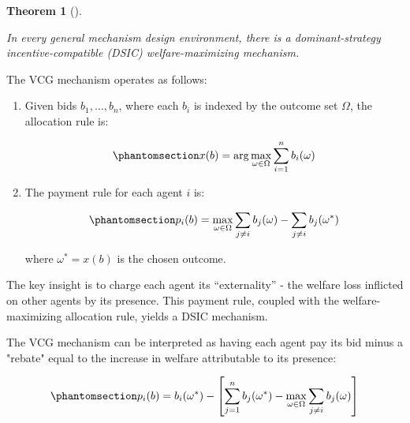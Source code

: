 \documentclass[
  letterpaper,
  numbers=noenddot,
  DIV=11]{scrreprt}
\theoremstyle{definition}
\theoremstyle{plain}
\theoremstyle{plain}
\newtheorem{theorem}{Theorem}[chapter]
\theoremstyle{remark}
\begin{document}
\begin{tcolorbox}[colframe=.grey, title=\faPenSquare \enspace Theorem]

\begin{theorem}[]\protect\hypertarget{thm-VCG}{}\label{thm-VCG}

\label{thm:VCG}{} In every general mechanism design
environment, there is a dominant-strategy incentive-compatible (DSIC)
welfare-maximizing mechanism.

\end{theorem}

\end{tcolorbox}

The VCG mechanism operates as follows:

\begin{enumerate}
\def\labelenumi{\arabic{enumi}.}
\item
  Given bids \(b_1, \ldots, b_n\), where each \(b_i\) is indexed by the
  outcome set \(\Omega\), the allocation rule is:

  \begin{equation}\phantomsection\label{eq-eq3.65}{x(b) = \arg \max_{\omega \in \Omega} \sum_{i=1}^n b_i(\omega)}\end{equation}
\item
  The payment rule for each agent \(i\) is:

  \begin{equation}\phantomsection\label{eq-eq3.66}{p_i(b) = \max_{\omega \in \Omega} \sum_{j \neq i} b_j(\omega) - \sum_{j \neq i} b_j(\omega^*)}\end{equation}

  where \(\omega^* = x(b)\) is the chosen outcome.
\end{enumerate}

The key insight is to charge each agent its ``externality'' - the
welfare loss inflicted on other agents by its presence. This payment
rule, coupled with the welfare-maximizing allocation rule, yields a DSIC
mechanism.

The VCG mechanism can be interpreted as having each agent pay its bid
minus a "rebate" equal to the increase in welfare attributable to its
presence:

\begin{equation}\phantomsection\label{eq-eq3.67}{p_i(b) = b_i(\omega^*) - \left[ \sum_{j=1}^n b_j(\omega^*) - \max_{\omega \in \Omega} \sum_{j \neq i} b_j(\omega) \right]}\end{equation}
\end{document}
